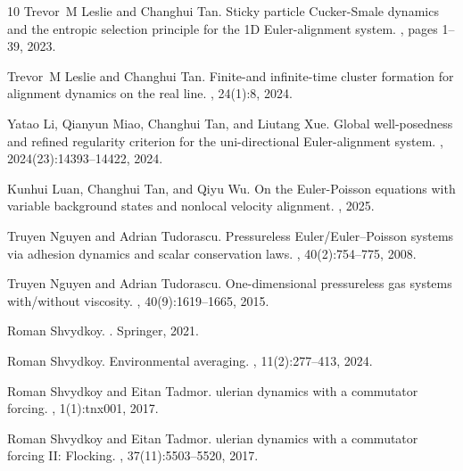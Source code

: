 \documentclass[11pt,reqno]{amsart}
\theoremstyle{definition}
\theoremstyle{remark}
\begin{document}
\begin{thebibliography}{10}
		Trevor~M Leslie and Changhui Tan.
		\newblock Sticky particle {C}ucker-{S}male dynamics and the entropic selection
		principle for the {1D} {E}uler-alignment system.
		, pages 1--39,
		2023.
		
		Trevor~M Leslie and Changhui Tan.
		\newblock Finite-and infinite-time cluster formation for alignment dynamics on
		the real line.
		, 24(1):8, 2024.
		
		Yatao Li, Qianyun Miao, Changhui Tan, and Liutang Xue.
		\newblock Global well-posedness and refined regularity criterion for the
		uni-directional {E}uler-alignment system.
		,
		2024(23):14393--14422, 2024.
		
		Kunhui Luan, Changhui Tan, and Qiyu Wu.
		\newblock On the {E}uler-{P}oisson equations with variable background states
		and nonlocal velocity alignment.
		, 2025.
		
		Truyen Nguyen and Adrian Tudorascu.
		\newblock Pressureless {E}uler/{E}uler--{P}oisson systems via adhesion dynamics
		and scalar conservation laws.
		, 40(2):754--775, 2008.
		
		Truyen Nguyen and Adrian Tudorascu.
		\newblock One-dimensional pressureless gas systems with/without viscosity.
		, 40(9):1619--1665, 2015.
		
		Roman Shvydkoy.
		.
		\newblock Springer, 2021.
		
		Roman Shvydkoy.
		\newblock Environmental averaging.
		, 11(2):277--413, 2024.
		
		Roman Shvydkoy and Eitan Tadmor.
		ulerian dynamics with a commutator forcing.
		, 1(1):tnx001,
		2017.
		
		Roman Shvydkoy and Eitan Tadmor.
		ulerian dynamics with a commutator forcing {II}: Flocking.
		, 37(11):5503--5520,
		2017.
		

\end{thebibliography}
\end{document}
